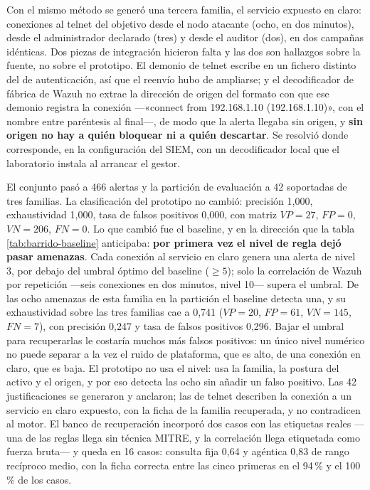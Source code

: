 Con el mismo método se generó una tercera familia, el servicio expuesto en claro: conexiones al
telnet del objetivo desde el nodo atacante (ocho, en dos minutos), desde el administrador
declarado (tres) y desde el auditor (dos), en dos campañas idénticas. Dos piezas de integración
hicieron falta y las dos son hallazgos sobre la fuente, no sobre el prototipo. El demonio de telnet
escribe en un fichero distinto del de autenticación, así que el reenvío hubo de ampliarse; y el
decodificador de fábrica de Wazuh no extrae la dirección de origen del formato con que ese
demonio registra la conexión ---«connect from 192.168.1.10 (192.168.1.10)», con el nombre entre
paréntesis al final---, de modo que la alerta llegaba sin origen, y \textbf{sin origen no hay a
quién bloquear ni a quién descartar}. Se resolvió donde corresponde, en la configuración del
SIEM, con un decodificador local que el laboratorio instala al arrancar el gestor.

El conjunto pasó a 466 alertas y la partición de evaluación a 42 soportadas de tres familias. La
clasificación del prototipo no cambió: precisión 1,000, exhaustividad 1,000, tasa de falsos
positivos 0,000, con matriz $VP=27$, $FP=0$, $VN=206$, $FN=0$. Lo que cambió fue el baseline, y
en la dirección que la tabla \ref{tab:barrido-baseline} anticipaba: \textbf{por primera vez el
nivel de regla dejó pasar amenazas}. Cada conexión al servicio en claro genera una alerta de nivel
3, por debajo del umbral óptimo del baseline ($\geq 5$); solo la correlación de Wazuh por
repetición ---seis conexiones en dos minutos, nivel 10--- supera el umbral. De las ocho amenazas
de esta familia en la partición el baseline detecta una, y su exhaustividad sobre las tres
familias cae a 0,741 ($VP=20$, $FP=61$, $VN=145$, $FN=7$), con precisión 0,247 y tasa de falsos
positivos 0,296. Bajar el umbral para recuperarlas le costaría muchos más falsos positivos: un
único nivel numérico no puede separar a la vez el ruido de plataforma, que es alto, de una
conexión en claro, que es baja. El prototipo no usa el nivel: usa la familia, la postura del
activo y el origen, y por eso detecta las ocho sin añadir un falso positivo. Las 42
justificaciones se generaron y anclaron; las de telnet describen la conexión a un servicio en
claro expuesto, con la ficha de la familia recuperada, y no contradicen al motor. El banco de
recuperación incorporó dos casos con las etiquetas reales ---una de las reglas llega sin técnica
MITRE, y la correlación llega etiquetada como fuerza bruta--- y queda en 16 casos: consulta fija
0,64 y agéntica 0,83 de rango recíproco medio, con la ficha correcta entre las cinco primeras en
el 94\,\% y el 100\,\% de los casos.

